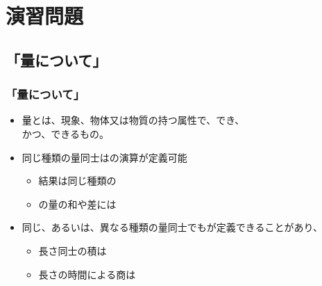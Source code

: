 \documentclass[unicode,12pt,aspectratio=169]{beamer}
\begin{document}
\appendix
\backupbegin

\section{演習問題}
\subsection{「量について」}
\begin{frame}
	\frametitle{「量について」}
	\begin{itemize}
		\item \textcolor<2>{black}{量}とは、現象、物体又は物質の持つ属性で、でき、\\かつ、できるもの。
		\item 同じ種類の量同士はの演算が定義可能
		\begin{itemize}
			\item 結果は同じ種類の
			\item {}の量の和や差には
		\end{itemize}
		\item 同じ、あるいは、異なる種類の量同士でもが定義できることがあり、
		\begin{itemize}
			\item 長さ同士の積は
			\item 長さの時間による商は
		\end{itemize}
	\end{itemize}
\end{frame}
\end{document}
